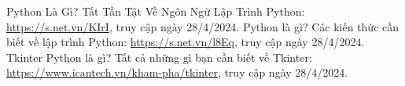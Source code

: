 \documentclass[a4paper]{article}
\begin{document}
\newpage
\begin{thebibliography}{80}

Python Là Gì? Tất Tần Tật Về Ngôn Ngữ Lập Trình Python:
\href{https://s.net.vn/KIrI}{https://s.net.vn/KIrI}, truy cập ngày 28/4/2024.
Python là gì? Các kiến thức cần biết về lập trình Python:
\href{https://s.net.vn/l8Eq}{https://s.net.vn/l8Eq}, truy cập ngày 28/4/2024.
Tkinter Python là gì? Tất cả những gì bạn cần biết về Tkinter:
\href{https://www.icantech.vn/kham-pha/tkinter}{https://www.icantech.vn/kham-pha/tkinter}, truy cập ngày 28/4/2024.
\end{thebibliography}
\end{document}
